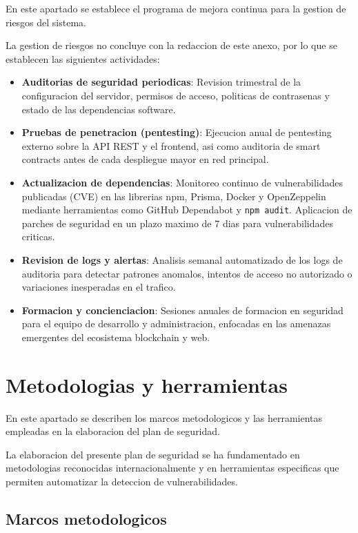 \documentclass[11pt, a4paper]{article}
\begin{document}
En este apartado se establece el programa de mejora continua para la gestion de riesgos del sistema.

La gestion de riesgos no concluye con la redaccion de este anexo, por lo que se establecen las siguientes actividades:

\begin{itemize}
    \item \textbf{Auditorias de seguridad periodicas}: Revision trimestral de la configuracion del servidor, permisos de acceso, politicas de contrasenas y estado de las dependencias software.
    \item \textbf{Pruebas de penetracion (pentesting)}: Ejecucion anual de pentesting externo sobre la API REST y el frontend, asi como auditoria de smart contracts antes de cada despliegue mayor en red principal.
    \item \textbf{Actualizacion de dependencias}: Monitoreo continuo de vulnerabilidades publicadas (CVE) en las librerias npm, Prisma, Docker y OpenZeppelin mediante herramientas como GitHub Dependabot y \texttt{npm audit}. Aplicacion de parches de seguridad en un plazo maximo de 7 dias para vulnerabilidades criticas.
    \item \textbf{Revision de logs y alertas}: Analisis semanal automatizado de los logs de auditoria para detectar patrones anomalos, intentos de acceso no autorizado o variaciones inesperadas en el trafico.
    \item \textbf{Formacion y concienciacion}: Sesiones anuales de formacion en seguridad para el equipo de desarrollo y administracion, enfocadas en las amenazas emergentes del ecosistema blockchain y web.
\end{itemize}

\section{Metodologias y herramientas}

En este apartado se describen los marcos metodologicos y las herramientas empleadas en la elaboracion del plan de seguridad.

La elaboracion del presente plan de seguridad se ha fundamentado en metodologias reconocidas internacionalmente y en herramientas especificas que permiten automatizar la deteccion de vulnerabilidades.

\subsection{Marcos metodologicos}
\end{document}

